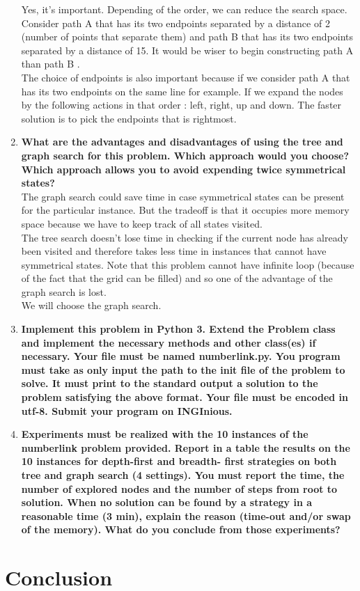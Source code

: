 \documentclass[10pt,a4paper]{article}
\begin{document}
\begin{enumerate}
	Yes, it's important. Depending of the order, we can reduce the search space. Consider path A that has its two endpoints separated by a distance of 2 (number of points that separate them) and path B that has its two endpoints separated by a distance of 15. It would be wiser to begin constructing path A than path B .\\
	
	The choice of endpoints is also important because if we consider path A that has its two endpoints on the same line for example. If we expand the nodes by the following actions in that order : left, right, up and down. The faster solution is to pick the endpoints that is rightmost.\\
	
	
	\item \textbf{What are the advantages and disadvantages of using the tree and graph search for this problem. Which approach would you choose? Which approach allows you to avoid expending twice symmetrical states?} \\
	
	The graph search could save time in case symmetrical states can be present for the particular instance. But the tradeoff  is that it occupies more memory space because we have to keep track of all states visited.\\
	
	The tree search doesn't lose time in checking if the current node has already been visited and therefore takes less time in instances that cannot have symmetrical states. Note that this problem cannot have infinite loop (because of the fact that the grid can be filled) and so one of the advantage of the graph search is lost. \\
	
	We will choose the graph search.
	
	\item \textbf{Implement this problem in Python 3. Extend the Problem class and implement the necessary methods and other class(es) if necessary. Your file must be named numberlink.py. You program must take as only input the path to the init file of the problem to solve. It must print to the standard output a solution to the problem satisfying the above format. Your file must be encoded in utf-8. Submit your program on INGInious.} \\
	
	\item \textbf{Experiments must be realized with the 10 instances of the numberlink problem provided. Report in a table the results on the 10 instances for depth-first and breadth- first strategies on both tree and graph search (4 settings). You must report the time, the number of explored nodes and the number of steps from root to solution. When no solution can be found by a strategy in a reasonable time (3 min), explain the reason (time-out and/or swap of the memory). What do you conclude from those experiments?} \\
	

\end{enumerate}

\section*{Conclusion}
\end{document}
